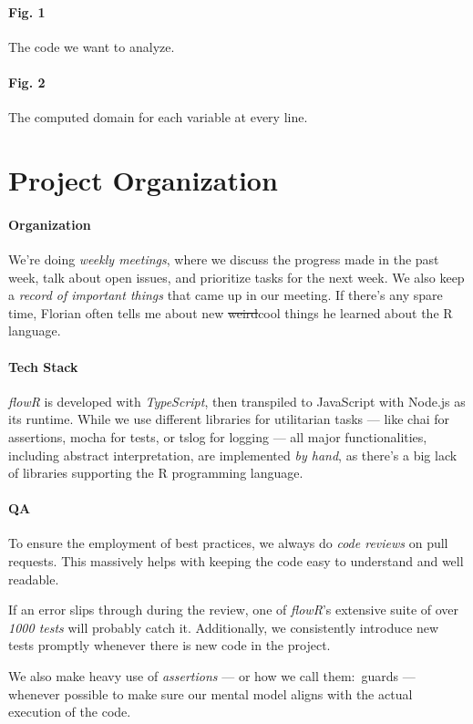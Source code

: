 \documentclass[color,coloraccent=red!60!black,listings]{poster}
\def\flowr{\textit{flowR}}
\begin{document}
\begin{multicols}{3}
\begin{minipage}{\dimexpr2\columnwidth+\columnsep\relax}
\begin{multicols}{2}
			\paragraph{Fig. 1} The code we want to analyze.\par\columnbreak
			\par
			\paragraph{Fig. 2} The computed domain for each variable at every line.
		\end{multicols}\bigskip
		\endgroup
		\lipsum[1-2]
	\end{minipage}\vfill\columnbreak\null\columnbreak
	\section*{Project Organization}
	\paragraph{Organization} We're doing \emph{weekly meetings}, where we discuss the
	progress made in the past week, talk about open issues, and prioritize tasks for the
	next week. We also keep a \emph{record of important things} that came up in our
	meeting. If there's any spare time, Florian often tells me about new
	\sout{weird}cool things he learned about the R language.
	\paragraph{Tech Stack} \flowr{} is developed with \emph{TypeScript}, then transpiled
	to JavaScript with Node.js as its runtime. While we use different libraries for
	utilitarian tasks --- like chai for assertions, mocha for tests, or tslog for
	logging --- all major functionalities, including abstract interpretation, are
	implemented \emph{by hand}, as there's a big lack of libraries supporting the R
	programming language.
	\paragraph{QA} To ensure the employment of best practices, we always do \emph{code
	reviews} on pull requests. This massively helps with keeping the code easy to
	understand and well readable.\par
	If an error slips through during the review, one of \flowr's extensive suite of over
	\emph{1000 tests} will probably catch it. Additionally, we consistently introduce
	new tests promptly whenever there is new code in the project.\par
	We also make heavy use of \emph{assertions} --- or how we call them:~guards ---
	whenever possible to make sure our mental model aligns with the actual execution of
	the code.

\end{multicols}
\end{document}
